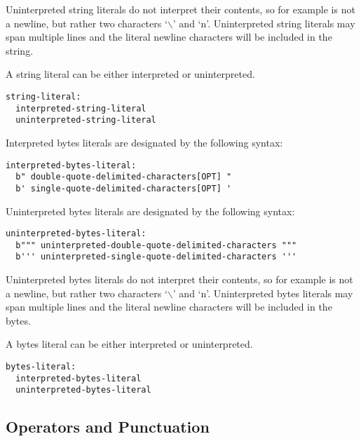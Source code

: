 Uninterpreted string literals do not interpret their contents, so for
example  is not a newline, but rather two
characters `$\backslash$' and `n'.  Uninterpreted string literals may
span multiple lines and the literal newline characters will be
included in the string.

A string literal can be either interpreted or uninterpreted.
\begin{syntax}
\begin{verbatim}
string-literal:
  interpreted-string-literal
  uninterpreted-string-literal
\end{verbatim}
\end{syntax}

\pagebreak
Interpreted bytes literals are designated by the following syntax:
\begin{syntax}
\begin{verbatim}
interpreted-bytes-literal:
  b" double-quote-delimited-characters[OPT] "
  b' single-quote-delimited-characters[OPT] '
\end{verbatim}
\end{syntax}

Uninterpreted bytes literals are designated by the following syntax:
\begin{syntax}
\begin{verbatim}
uninterpreted-bytes-literal:
  b""" uninterpreted-double-quote-delimited-characters """
  b''' uninterpreted-single-quote-delimited-characters '''
\end{verbatim}
\end{syntax}

Uninterpreted bytes literals do not interpret their contents, so for
example  is not a newline, but rather two
characters `$\backslash$' and `n'.  Uninterpreted bytes literals may
span multiple lines and the literal newline characters will be
included in the bytes.

A bytes literal can be either interpreted or uninterpreted.
\begin{syntax}
\begin{verbatim}
bytes-literal:
  interpreted-bytes-literal
  uninterpreted-bytes-literal
\end{verbatim}
\end{syntax}

\subsection{Operators and Punctuation}
\label{Operators_and_Punctuation}


